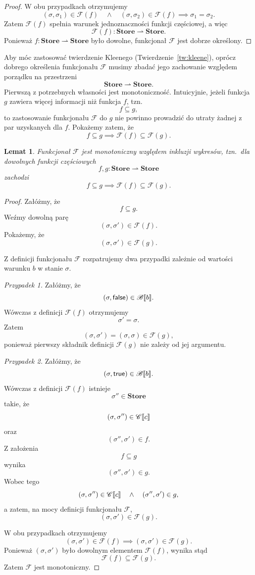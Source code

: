 \documentclass[11pt,a4paper]{article}
\theoremstyle{definition}
\theoremstyle{plain}
\newtheorem{lemat}[definicja]{Lemat}
\DeclarePairedDelimiter{\semdelim}{\llbracket}{\rrbracket}
\newcommand{\sem}[1]{\semdelim{#1}}
\newcommand{\Cc}{\mathscr{C}}   %
\newcommand{\Bb}{\mathscr{B}}   %
\newcommand{\Store}{\textbf{Store}}
\newcommand{\kw}[1]{\ensuremath{\mathsf{#1}}} %
\begin{document}
\begin{proof}
	W obu przypadkach otrzymujemy
	\[
	(\sigma,\sigma_1)\in\mathcal{F}(f)
	\quad\land\quad
	(\sigma,\sigma_2)\in\mathcal{F}(f)
	\implies
	\sigma_1=\sigma_2.
	\]
	Zatem $\mathcal{F}(f)$ spełnia warunek jednoznaczności funkcji
	częściowej, a więc
	\[
	\mathcal{F}(f):\Store\rightharpoonup\Store.
	\]
	Ponieważ $f:\Store\rightharpoonup\Store$ było dowolne, funkcjonał
	$\mathcal{F}$ jest dobrze określony.
\end{proof}

Aby móc zastosować twierdzenie Kleenego (Twierdzenie~\ref{tw:kleene}), oprócz dobrego określenia
funkcjonału $\mathcal{F}$ musimy zbadać jego zachowanie względem
porządku na przestrzeni
\[
\Store\rightharpoonup\Store.
\]
Pierwszą z potrzebnych własności jest monotoniczność. Intuicyjnie,
jeżeli funkcja $g$ zawiera więcej informacji niż funkcja $f$, tzn.
\[
f\subseteq g,
\]
to zastosowanie funkcjonału $\mathcal{F}$ do $g$ nie powinno prowadzić
do utraty żadnej z par uzyskanych dla $f$. Pokażemy zatem, że
\[
f\subseteq g
\implies
\mathcal{F}(f)\subseteq\mathcal{F}(g).
\]

\begin{lemat}\label{lemat:F_monotoniczny}
	Funkcjonał $\mathcal{F}$ jest monotoniczny względem inkluzji wykresów,
	tzn.\ dla dowolnych funkcji częściowych
	\[
	f,g:\Store\rightharpoonup\Store
	\]
	zachodzi
	\[
	f\subseteq g
	\implies
	\mathcal{F}(f)\subseteq\mathcal{F}(g).
	\]
\end{lemat}

\begin{proof}
	Załóżmy, że
	\[
	f\subseteq g.
	\]
	Weźmy dowolną parę
	\[
	(\sigma,\sigma')\in\mathcal{F}(f).
	\]
	Pokażemy, że
	\[
	(\sigma,\sigma')\in\mathcal{F}(g).
	\]
	
	Z definicji funkcjonału $\mathcal{F}$ rozpatrujemy dwa przypadki
	zależnie od wartości warunku $b$ w stanie $\sigma$.
	
	\emph{Przypadek 1.}
	Załóżmy, że
	\[
	(\sigma,\kw{false})\in\Bb\sem{b}.
	\]
	Wówczas z definicji $\mathcal{F}(f)$ otrzymujemy
	\[
	\sigma'=\sigma.
	\]
	Zatem
	\[
	(\sigma,\sigma')
	=
	(\sigma,\sigma)
	\in\mathcal{F}(g),
	\]
	ponieważ pierwszy składnik definicji $\mathcal{F}(g)$ nie zależy od
	jej argumentu.
	
	\emph{Przypadek 2.}
	Załóżmy, że
	\[
	(\sigma,\kw{true})\in\Bb\sem{b}.
	\]
	Wówczas z definicji $\mathcal{F}(f)$ istnieje
	\[
	\sigma''\in\Store
	\]
	takie, że
	\[
	(\sigma,\sigma'')\in\Cc\sem{c}
	\]
	oraz
	\[
	(\sigma'',\sigma')\in f.
	\]
	Z założenia
	\[
	f\subseteq g
	\]
	wynika
	\[
	(\sigma'',\sigma')\in g.
	\]
	Wobec tego
	\[
	(\sigma,\sigma'')\in\Cc\sem{c}
	\quad\land\quad
	(\sigma'',\sigma')\in g,
	\]
	a zatem, na mocy definicji funkcjonału $\mathcal{F}$,
	\[
	(\sigma,\sigma')\in\mathcal{F}(g).
	\]
	
	W obu przypadkach otrzymujemy
	\[
	(\sigma,\sigma')\in\mathcal{F}(f)
	\implies
	(\sigma,\sigma')\in\mathcal{F}(g).
	\]
	Ponieważ $(\sigma,\sigma')$ było dowolnym elementem
	$\mathcal{F}(f)$, wynika stąd
	\[
	\mathcal{F}(f)\subseteq\mathcal{F}(g).
	\]
	Zatem $\mathcal{F}$ jest monotoniczny.
\end{proof}
\end{document}

